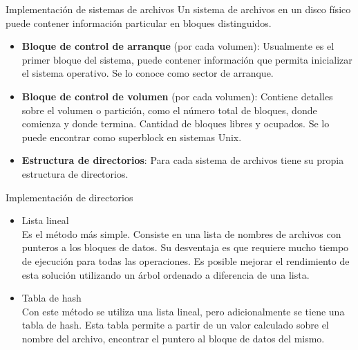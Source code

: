 \documentclass[aspectratio=169]{beamer}
\begin{document}
\begin{frame}[fragile,t]{Implementación de sistemas de archivos}
    Un sistema de archivos en un disco físico puede contener información particular en bloques distinguidos.\\
    \bigskip
    \begin{itemize}
    \setlength\itemsep{0.4cm}
        \item \textbf{Bloque de control de arranque} (por cada volumen): Usualmente es el primer bloque del sistema, puede contener información que permita inicializar el sistema operativo. Se lo conoce como sector de arranque.
    \item \textbf{Bloque de control de volumen} (por cada volumen): Contiene detalles sobre el volumen o partición, como el número total de bloques, donde comienza y donde termina. Cantidad de bloques libres y ocupados. Se lo puede encontrar como superblock en sistemas Unix.
    \item \textbf{Estructura de directorios}: Para cada sistema de archivos tiene su propia estructura de directorios.
    \end{itemize}
\end{frame}

\begin{frame}[fragile]{Implementación de directorios}
    \begin{itemize}
    \setlength\itemsep{0.5cm}
    \item \textcolor{naranjauca}{Lista lineal}\\
    Es el método más simple. Consiste en una lista de nombres de archivos con punteros a los bloques de datos.
    Su desventaja es que requiere mucho tiempo de ejecución para todas las operaciones.
    Es posible mejorar el rendimiento de esta solución utilizando un árbol ordenado a diferencia de una lista.
    \pause
    \item \textcolor{naranjauca}{Tabla de hash}\\
    Con este método se utiliza una lista lineal, pero adicionalmente se tiene una tabla de hash.
    Esta tabla permite a partir de un valor calculado sobre el nombre del archivo, encontrar el puntero al bloque de datos del mismo.
    \end{itemize}
\end{frame}
\end{document}
